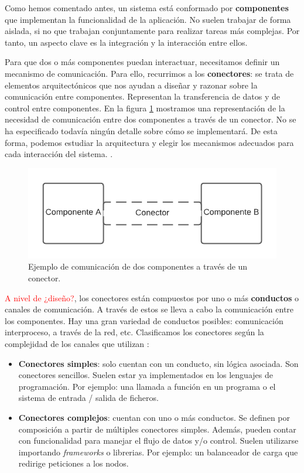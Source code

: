 Como hemos comentado antes, un sistema está conformado por \textbf{componentes} que implementan la funcionalidad de la aplicación. No suelen trabajar de forma aislada, si no que trabajan conjuntamente para realizar tareas más complejas. Por tanto, un aspecto clave es la integración y la interacción entre ellos. \cite{mehtaTaxonomySoftwareConnectors2000}

Para que dos o más componentes puedan interactuar, necesitamos definir un mecanismo de comunicación. Para ello, recurrimos a los \textbf{conectores}: se trata de elementos arquitectónicos que nos ayudan a diseñar y razonar sobre la comunicación entre componentes. Representan la transferencia de datos y de control entre componentes. En la figura \ref{fig:componentesEjemplo} mostramos una representación de la necesidad de comunicación entre dos componentes a través de un conector. No se ha especificado todavía ningún detalle sobre cómo se implementará. De esta forma, podemos estudiar la arquitectura y elegir los mecanismos adecuados para cada interacción del sistema. \cite{taylorSoftwareArchitectureFoundations2009}.

\begin{figure}[h!]
  \centering
  \includegraphics[scale=0.78]{02_arquitectura/images/conector}
  \caption{Ejemplo de comunicación de dos componentes a través de un conector.}
  \label{fig:componentesEjemplo}
\end{figure}

\textcolor{red}{A nivel de ¿diseño?}, los conectores están compuestos por uno o más \textbf{conductos} o canales de comunicación. A través de estos se lleva a cabo la comunicación entre los componentes. Hay una gran variedad de conductos posibles: comunicación interproceso, a través de la red, etc. Clasificamos los conectores según la complejidad de los canales que utilizan \cite{mehtaTaxonomySoftwareConnectors2000}:

\begin{itemize}
    \item \textbf{Conectores simples}: solo cuentan con un conducto, sin lógica asociada. Son conectores sencillos. Suelen estar ya implementados en los lenguajes de programación. Por ejemplo: una llamada a función en un programa o el sistema de entrada / salida de ficheros.

    \item \textbf{Conectores complejos}: cuentan con uno o más conductos. Se definen por composición a partir de múltiples conectores simples. Además, pueden contar con funcionalidad para manejar el flujo de datos y/o control. Suelen utilizarse importando \textit{frameworks} o librerias. Por ejemplo: un balanceador de carga que redirige peticiones a los nodos.
\end{itemize}

